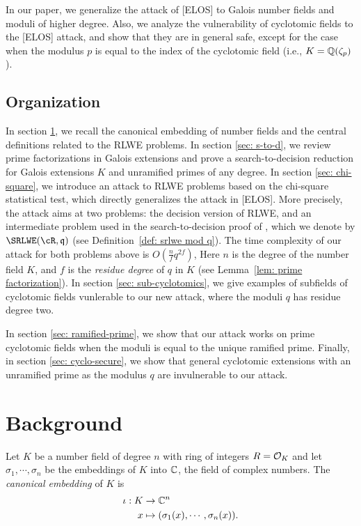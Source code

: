 \documentclass{amsart}
\begin{document}
In our paper, we generalize the attack of [ELOS] to Galois number fields and moduli of higher degree. Also, we analyze the vulnerability of cyclotomic fields to the [ELOS] attack, and show that they are in general safe, except for the case when the modulus $p$ is equal to the index of the cyclotomic field (i.e., $K = \mathbb{Q}(\zeta_p)$).


\subsection{Organization}

In section \ref{sec: background}, we recall the canonical embedding of number fields and the central definitions related to the RLWE problems. In section \ref{sec: s-to-d}, we review prime factorizations in Galois extensions and prove a search-to-decision reduction for Galois extensions $K$ and unramified primes of any degree. In section \ref{sec: chi-square}, we introduce an attack to RLWE problems based on the chi-square statistical test, which directly generalizes the attack in [ELOS]. More precisely, the attack aims at two problems: the decision version of RLWE, and an intermediate problem used in the search-to-decision proof of \cite{lyubashevsky2013ideal}, which we denote by $\SRLWE(\cR,\fq)$ (see Definition~\ref{def: srlwe mod q}). The time complexity of our attack for both problems above is $O(\frac{n}{f}q^{2f})$, Here $n$ is the degree of the number field $K$, and $f$ is the {\it residue degree} of $q$ in $K$ (see Lemma~\ref{lem: prime factorization}). In section \ref{sec: sub-cyclotomics}, we give examples of subfields of cyclotomic fields vunlerable to our new attack, where the moduli $q$ has residue degree two.

In section \ref{sec: ramified-prime}, we show that our attack works on prime cyclotomic fields when the moduli is equal to the unique ramified prime. Finally, in section \ref{sec: cyclo-secure}, we show that general cyclotomic extensions with an unramified prime as the modulus $q$ are invulnerable to our attack.





\section{Background} \label{sec: background}

Let $K$ be a number field of degree $n$ with ring of integers $R = \mathcal{O}_K$ and let $\sigma_1, \cdots, \sigma_n$ be the embeddings of $K$ into $\mathbb{C}$, the field of complex numbers. The {\it canonical embedding} of $K$ is
\begin{align*}
    \iota: K &\to \mathbb{C}^n \\
     x & \mapsto (\sigma_1(x), \cdots, \sigma_n(x)).
\end{align*}
\end{document}
